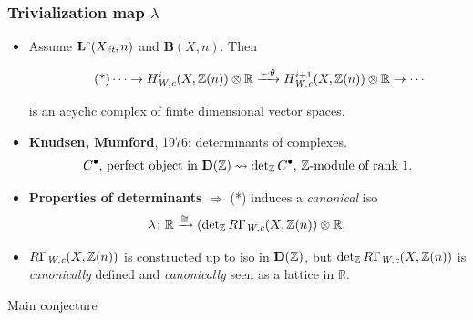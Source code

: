 \documentclass[handout]{beamer}
\newcommand{\personality}[1]{{\bf #1}}
\newcommand{\ZZ}{\mathbb{Z}}
\newcommand{\RR}{\mathbb{R}}
\newcommand{\isom}{\cong}
\newcommand{\categ}[1]{\text{\bf #1}}
\begin{document}
\begin{frame}
  \frametitle{Trivialization map $\lambda$}

  \begin{itemize}
  \item<2-> Assume $\mathbf{L}^c (X_\text{\it ét},n)$ and
    $\mathbf{B} (X,n)$. Then

    \[ \tag{*} \cdots \to H_\text{\it W,c}^i (X, \ZZ(n)) \otimes \RR
      \xrightarrow{\smile\theta}
      H_\text{\it W,c}^{i+1} (X, \ZZ(n)) \otimes \RR \to \cdots \]

    is an acyclic complex of finite dimensional vector spaces.

  \item<3-> \personality{Knudsen, Mumford}, 1976: determinants of complexes.
    $$C^\bullet \text{, perfect object in }\categ{D} (\ZZ) \leadsto
    \det\nolimits_\ZZ C^\bullet\text{, }\ZZ\text{-module of rank }1.$$

  \item<4-> \textbf{Properties of determinants} $\Rightarrow$ (*)
    induces a \emph{canonical} iso
    $$\lambda\colon \RR \xrightarrow{\isom}
    (\det\nolimits_\ZZ R\Gamma_\text{\it W,c} (X,\ZZ(n)) \otimes \RR.$$

  \item<5-> $R\Gamma_\text{\it W,c} (X,\ZZ(n))$ is constructed up to iso in
    $\categ{D} (\ZZ)$, but $\det\nolimits_\ZZ R\Gamma_\text{\it W,c} (X,\ZZ(n))$
    is \emph{canonically} defined and \emph{canonically} seen as a lattice in
    $\RR$.
  \end{itemize}
\end{frame}


\begin{frame}[plain]
  \headingfont

  \vspace{\fill}

  \begin{center}
    {\huge Main conjecture}
  \end{center}

  \vspace{\fill}
\end{frame}

\end{document}
